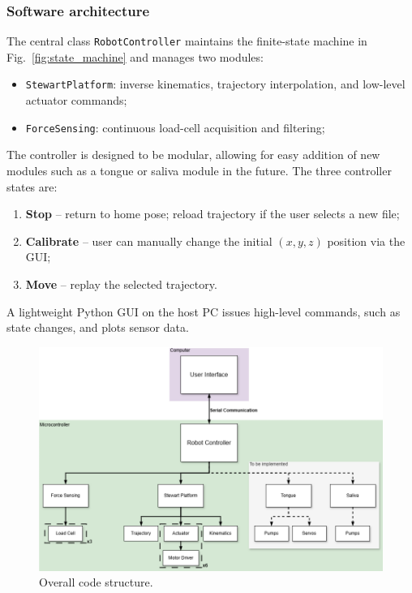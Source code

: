 \subsubsection{Software architecture}
The central class \texttt{RobotController} maintains the finite-state machine in Fig.~\ref{fig:state_machine} and manages two
 modules:  
\begin{itemize}[nosep]
    \item \texttt{StewartPlatform}: inverse kinematics, trajectory interpolation, and low-level actuator commands;
    \item \texttt{ForceSensing}: continuous load-cell acquisition and filtering;
\end{itemize}
The controller is designed to be modular, allowing for easy addition of new modules such as a tongue or saliva module in the future.
The three controller states are:
\begin{enumerate}
    \item \textbf{Stop} – return to home pose; reload trajectory if the user selects a new file;
    \item \textbf{Calibrate} – user can manually change the initial $(x,y,z)$ position via the GUI;
    \item \textbf{Move} – replay the selected trajectory.
\end{enumerate}
A lightweight Python GUI on the host PC issues high-level commands, such as state changes, and plots sensor data.  

\begin{figure}[H]
\centering
\includegraphics[width=\textwidth]{figures/code_structure.drawio.png}
\caption{Overall code structure.}
\label{fig:code_structure}
\end{figure}

